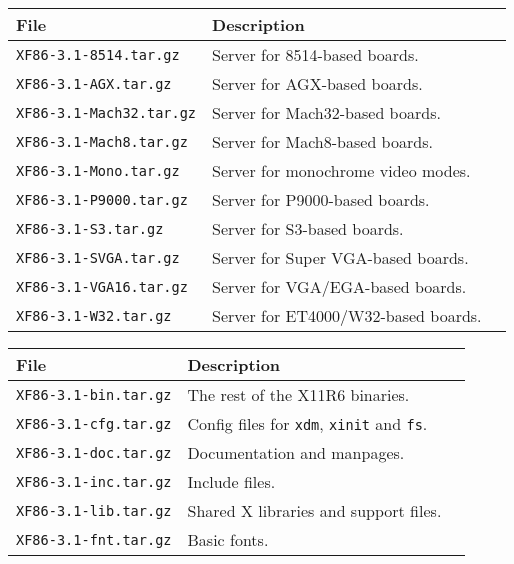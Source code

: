 {\newpage
\clearpage
\samepage \begin{tabular}{lll} 
\hline
File					& Description     \\ 
\hline
{\tt XF86-3.1-8514.tar.gz}  		&  Server for 8514-based boards. \\ 
{\tt XF86-3.1-AGX.tar.gz}    		&  Server for AGX-based boards. \\ 
{\tt XF86-3.1-Mach32.tar.gz} 		&  Server for Mach32-based boards. \\ 
{\tt XF86-3.1-Mach8.tar.gz}   		& Server for Mach8-based boards. \\ 
{\tt XF86-3.1-Mono.tar.gz}    		& Server for monochrome video modes. \\ 
{\tt XF86-3.1-P9000.tar.gz}  		& Server for P9000-based boards. \\ 
{\tt XF86-3.1-S3.tar.gz}      		& Server for S3-based boards. \\ 
{\tt XF86-3.1-SVGA.tar.gz}    		& Server for Super VGA-based boards. \\ 
{\tt XF86-3.1-VGA16.tar.gz} 		&   Server for VGA/EGA-based boards. \\ 
{\tt XF86-3.1-W32.tar.gz}     		& Server for ET4000/W32-based boards. \\ 
\hline
\end{tabular}
}

{\newpage
\clearpage
\samepage \begin{tabular}{lll} 
\hline
File					& Description     \\ 
\hline
{\tt XF86-3.1-bin.tar.gz}    		& The rest of the X11R6 binaries. \\ 
{\tt XF86-3.1-cfg.tar.gz}    		& Config files for {\tt xdm}, {\tt xinit} and {\tt fs}. \\ 
{\tt XF86-3.1-doc.tar.gz}    		& Documentation and manpages. \\ 
{\tt XF86-3.1-inc.tar.gz}     		& Include files. \\ 
{\tt XF86-3.1-lib.tar.gz}     		& Shared X libraries and support files. \\ 
{\tt XF86-3.1-fnt.tar.gz}     		& Basic fonts. \\ 
\hline
\end{tabular}
}

